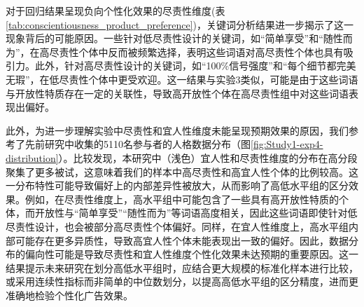 对于回归结果呈现负向个性化效果的尽责性维度(表 \ref{tab:conscientiousness_product_preference})，关键词分析结果进一步揭示了这一现象背后的可能原因。一些针对低尽责性设计的关键词，如“简单享受”和“随性而为”，在高尽责性个体中反而被频繁选择，表明这些词语对高尽责性个体也具有吸引力。此外，针对高尽责性设计的关键词，如“100\%信号强度”和“每个细节都完美无瑕”，在低尽责性个体中更受欢迎。这一结果与实验3类似，可能是由于这些词语与开放性特质存在一定的关联性，导致高开放性个体在高尽责性组中对这些词语表现出偏好。

此外，为进一步理解实验中尽责性和宜人性维度未能呈现预期效果的原因，我们参考了先前研究中收集的5110名参与者的人格数据分布（图\ref{fig:Study1-exp4-distribution}）。比较发现，本研究中（浅色）宜人性和尽责性维度的分布在高分段聚集了更多被试，这意味着我们的样本中高尽责性和高宜人性个体的比例较高。这一分布特性可能导致偏好上的内部差异性被放大，从而影响了高低水平组的区分效果。例如，在尽责性维度上，高水平组中可能包含了一些具有高开放性特质的个体，而开放性与“简单享受”“随性而为”等词语高度相关，因此这些词语即使针对低尽责性设计，也会被部分高尽责性个体偏好。同样，在宜人性维度上，高水平组内部可能存在更多异质性，导致高宜人性个体未能表现出一致的偏好。因此，数据分布的偏向性可能是导致尽责性和宜人性维度个性化效果未达预期的重要原因。这一结果提示未来研究在划分高低水平组时，应结合更大规模的标准化样本进行比较，或采用连续性指标而非简单的中位数划分，以提高高低水平组的区分精度，进而更准确地检验个性化广告效果。


